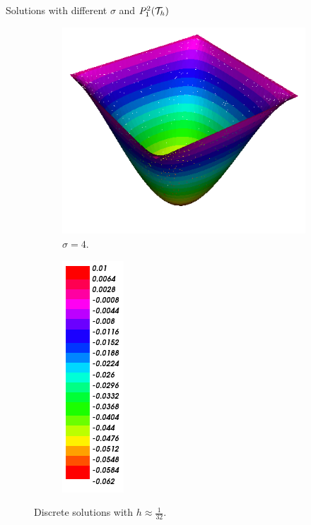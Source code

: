 \begin{frame}{Solutions with different $\sigma$ and $\relax{P}_1^2(\mathcal{T}_h)$}
\begin{figure}[h!]
\begin{subfigure}[b]{0.27\textwidth}
				\includegraphics[scale=0.18]{img/Difusion/Recortes/steady_diffusion_approx_sigma_4.png}
				\caption{\scriptsize $\sigma=4$.}
			\end{subfigure}
			\begin{subfigure}[b]{0.15\textwidth}
				\centering
				\includegraphics[scale=0.23]{img/Difusion/Recortes/steady_diffusion_values.png}
			\end{subfigure}
			\caption{\scriptsize Discrete solutions with $h\approx\frac{1}{32}$.}
		\end{figure}
		
		\end{frame}
		
